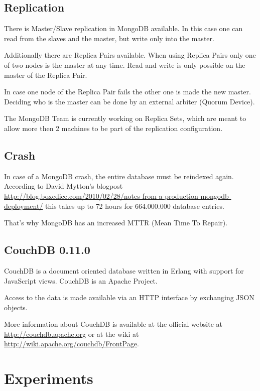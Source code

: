 \subsection{Replication}

There is Master/Slave replication in MongoDB available. In this
case one can read from the slaves and the master, but write only
into the master.

Additionally there are Replica Pairs available. When using Replica
Pairs only one of two nodes is the master at any time. Read and
write is only possible on the master of the Replica Pair.

In case one node of the Replica Pair fails the other one is made
the new master. Deciding who is the master can be done by an
external arbiter (Quorum Device).

The MongoDB Team is currently working on Replica Sets, which are
meant to allow more then 2 machines to be part of the replication
configuration.

\subsection{Crash}

In case of a MongoDB crash, the entire database must be reindexed
again. According to David Mytton's blogpost
\url{http://blog.boxedice.com/2010/02/28/notes-from-a-production-mongodb-deployment/}
this takes up to 72 hours for 664.000.000 database entries.

That's why MongoDB has an increased MTTR (Mean Time To Repair).

\subsection{CouchDB 0.11.0}

CouchDB is a document oriented database written in Erlang with
support for JavaScript views. CouchDB is an Apache Project.

Access to the data is made available via an HTTP interface by
exchanging JSON objects.

More information about CouchDB is available at the official website
at \url{http://couchdb.apache.org} or at the wiki at
\url{http://wiki.apache.org/couchdb/FrontPage}.

\section{Experiments}

